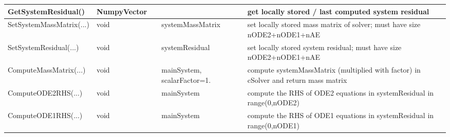 \begin{center}
\begin{longtable}{| p{4.2cm} | p{2.5cm} | p{0.3cm} | p{3.0cm} | p{6cm} |}
    GetSystemResidual() &     NumpyVector &      &      &     get locally stored / last computed system residual\\ \hline
    SetSystemMassMatrix(...) &     void &      &     systemMassMatrix &     set locally stored mass matrix of solver; must have size nODE2+nODE1+nAE\\ \hline
    SetSystemResidual(...) &     void &      &     systemResidual &     set locally stored system residual; must have size nODE2+nODE1+nAE\\ \hline
    ComputeMassMatrix(...) &     void &      &     mainSystem, scalarFactor=1. &     compute systemMassMatrix (multiplied with factor) in cSolver and return mass matrix\\ \hline
    ComputeODE2RHS(...) &     void &      &     mainSystem &     compute the RHS of ODE2 equations in systemResidual in range(0,nODE2)\\ \hline
    ComputeODE1RHS(...) &     void &      &     mainSystem &     compute the RHS of ODE1 equations in systemResidual in range(0,nODE1)\\ \hline
	  \end{longtable}
	\end{center}
